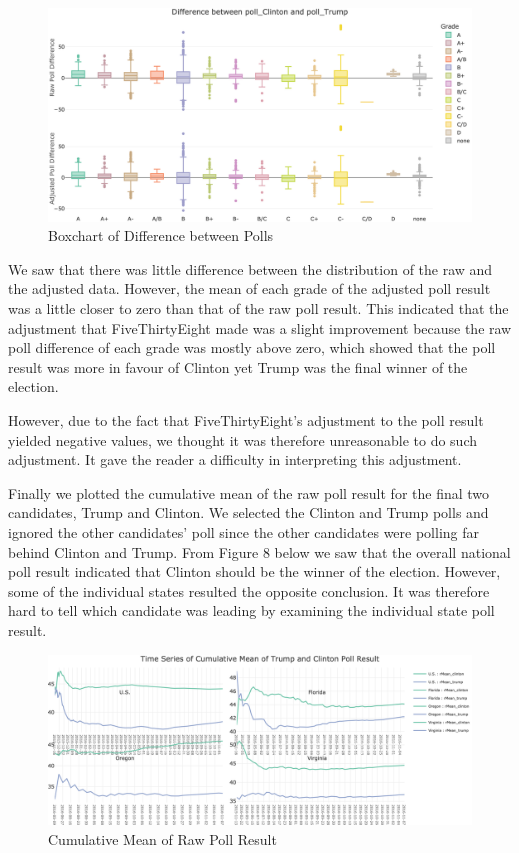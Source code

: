 \documentclass[
  11pt,
]{article}
\begin{document}
\begin{figure}

{\centering \includegraphics{./Figures/boxchart} 

}

\caption{Boxchart of Difference between Polls}\label{fig:unnamed-chunk-21}
\end{figure}

We saw that there was little difference between the distribution of the
raw and the adjusted data. However, the mean of each grade of the
adjusted poll result was a little closer to zero than that of the raw
poll result. This indicated that the adjustment that FiveThirtyEight
made was a slight improvement because the raw poll difference of each
grade was mostly above zero, which showed that the poll result was more
in favour of Clinton yet Trump was the final winner of the election.

However, due to the fact that FiveThirtyEight's adjustment to the poll
result yielded negative values, we thought it was therefore unreasonable
to do such adjustment. It gave the reader a difficulty in interpreting
this adjustment.

Finally we plotted the cumulative mean of the raw poll result for the
final two candidates, Trump and Clinton. We selected the Clinton and
Trump polls and ignored the other candidates' poll since the other
candidates were polling far behind Clinton and Trump. From Figure 8
below we saw that the overall national poll result indicated that
Clinton should be the winner of the election. However, some of the
individual states resulted the opposite conclusion. It was therefore
hard to tell which candidate was leading by examining the individual
state poll result.

\begin{figure}

{\centering \includegraphics{./Figures/cMeanchart} 

}

\caption{Cumulative Mean of Raw Poll Result}\label{fig:unnamed-chunk-23}
\end{figure}
\end{document}
